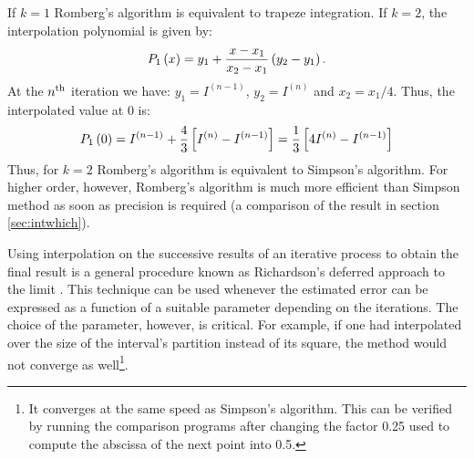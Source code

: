 \documentclass[twoside]{book}
\begin{document}
If $k=1$ Romberg's algorithm is equivalent to trapeze integration.
If $k=2$, the interpolation polynomial is given by:
\begin{equation}
P_1\left(x\right)=y_1+{x-x_1 \over x_2-x_1}\left(y_2-y_1\right).
\end{equation}
At the $n^{\mathop{\rm th}}$ iteration we have:
$y_1=I^{\left(n-1\right)}$, $y_2=I^{\left(n\right)}$ and
$x_2=x_1/4$. Thus, the interpolated value at 0 is:
\begin{equation}
P_1\left(0\right)=I^{\left(n-1\right)}+{4 \over
3}\left[I^{\left(n\right)}-I^{\left(n-1\right)}\right] ={1\over
3}\left[4I^{\left(n\right)}-I^{\left(n-1\right)}\right]
\end{equation}
Thus, for $k=2$ Romberg's algorithm is equivalent to Simpson's
algorithm. For higher order, however, Romberg's algorithm is much
more efficient than Simpson method as soon as precision is
required (\cf a comparison of the result in section
\ref{sec:intwhich}).

Using interpolation on the successive results of an iterative
process to obtain the final result is a general procedure known as
Richardson's deferred approach to the limit \cite{Press}. This
technique can be used whenever the estimated error can be
expressed as a function of a suitable parameter depending on the
iterations. The choice of the parameter, however, is critical. For
example, if one had interpolated over the size of the interval's
partition instead of its square, the method would not converge as
well\footnote{It converges at the same speed as Simpson's
algorithm. This can be verified by running the comparison programs
after changing the factor 0.25 used to compute the abscissa of the
next point into 0.5.}.
\end{document}
